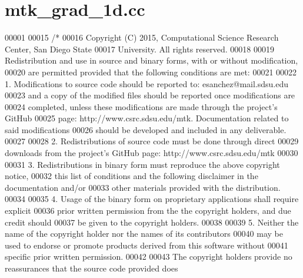 \hypertarget{mtk__grad__1d_8cc_source}{\section{mtk\+\_\+grad\+\_\+1d.\+cc}
\label{mtk__grad__1d_8cc_source}
}

\begin{DoxyCode}
00001 
00015 \textcolor{comment}{/*}
00016 \textcolor{comment}{Copyright (C) 2015, Computational Science Research Center, San Diego State}
00017 \textcolor{comment}{University. All rights reserved.}
00018 \textcolor{comment}{}
00019 \textcolor{comment}{Redistribution and use in source and binary forms, with or without modification,}
00020 \textcolor{comment}{are permitted provided that the following conditions are met:}
00021 \textcolor{comment}{}
00022 \textcolor{comment}{1. Modifications to source code should be reported to: esanchez@mail.sdsu.edu}
00023 \textcolor{comment}{and a copy of the modified files should be reported once modifications are}
00024 \textcolor{comment}{completed, unless these modifications are made through the project's GitHub}
00025 \textcolor{comment}{page: http://www.csrc.sdsu.edu/mtk. Documentation related to said modifications}
00026 \textcolor{comment}{should be developed and included in any deliverable.}
00027 \textcolor{comment}{}
00028 \textcolor{comment}{2. Redistributions of source code must be done through direct}
00029 \textcolor{comment}{downloads from the project's GitHub page: http://www.csrc.sdsu.edu/mtk}
00030 \textcolor{comment}{}
00031 \textcolor{comment}{3. Redistributions in binary form must reproduce the above copyright notice,}
00032 \textcolor{comment}{this list of conditions and the following disclaimer in the documentation and/or}
00033 \textcolor{comment}{other materials provided with the distribution.}
00034 \textcolor{comment}{}
00035 \textcolor{comment}{4. Usage of the binary form on proprietary applications shall require explicit}
00036 \textcolor{comment}{prior written permission from the the copyright holders, and due credit should}
00037 \textcolor{comment}{be given to the copyright holders.}
00038 \textcolor{comment}{}
00039 \textcolor{comment}{5. Neither the name of the copyright holder nor the names of its contributors}
00040 \textcolor{comment}{may be used to endorse or promote products derived from this software without}
00041 \textcolor{comment}{specific prior written permission.}
00042 \textcolor{comment}{}
00043 \textcolor{comment}{The copyright holders provide no reassurances that the source code provided does}

\end{DoxyCode}
